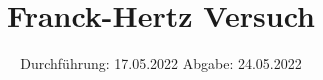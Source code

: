 

\subject{VERSUCH 601}
\title{Franck-Hertz Versuch}
\date{%
  Durchführung: 17.05.2022
  \hspace{3em}
  Abgabe: 24.05.2022
}



\maketitle
\thispagestyle{empty}
\tableofcontents
\newpage






\printbibliography{}


